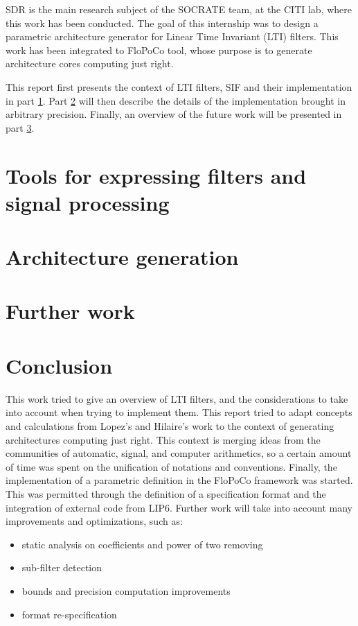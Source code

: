 \documentclass[twoside]{article}
\theoremstyle{remark}
\numberwithin{equation}{subsection}
\begin{document}
	
	SDR is the main research subject of the SOCRATE team, at the CITI lab, where this work has been conducted.
	The goal of this internship was to design a parametric architecture generator for Linear Time Invariant (LTI) filters.
	This work has been integrated to FloPoCo tool,
	whose purpose is to generate architecture cores computing just right.


	This report first presents the context of LTI filters, SIF and their implementation in part \ref{Part1}.
	Part \ref{Part2} will then describe the details of the implementation brought in arbitrary precision.
	Finally, an overview of the future work will be presented in part \ref{Part3}.

\section{Tools for expressing filters and signal processing}
\label{Part1}


\section{Architecture generation}
\label{Part2}


\section{Further work}
\label{Part3}


\section*{Conclusion}
	This work tried to give an overview of LTI filters, and the considerations to take into account when trying to implement them.
	This report tried to adapt concepts and calculations from Lopez's and Hilaire's work to the context of generating architectures computing just right.
	This context is merging ideas from the communities of automatic, signal, and computer arithmetics, so a certain amount of time was spent on the unification of notations and conventions.
	Finally, the implementation of a parametric definition in the FloPoCo framework was started.
	This was permitted through the definition of a specification format and the integration of external code from LIP6.
	Further work will take into account many improvements and optimizations, such as:
	\begin{itemize}
		\item static analysis on coefficients and power of two removing
		\item sub-filter detection
		\item bounds and precision computation improvements
		\item format re-specification
	\end{itemize}
\end{document}
